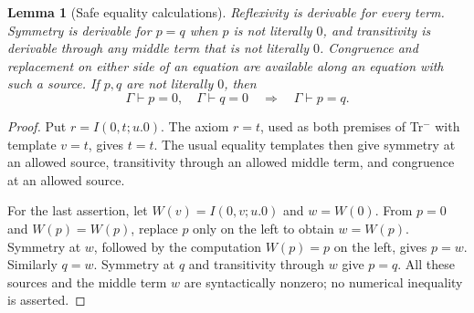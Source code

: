 \documentclass[11pt,letterpaper]{article}
\newtheorem{lemma}[theorem]{Lemma}
\theoremstyle{definition}
\begin{document}
\begin{lemma}[Safe equality calculations]\label{lem:safe-equality}
Reflexivity is derivable for every term.  Symmetry is derivable for $p=q$
when $p$ is not literally $0$, and transitivity is derivable through any
middle term that is not literally $0$.  Congruence and replacement on
either side of an equation are available along an equation with such a
source.  If $p,q$ are not literally $0$, then
\[
 \Gamma\vdash p=0,\quad\Gamma\vdash q=0
 \quad\Longrightarrow\quad\Gamma\vdash p=q.
 \tag{Zero join}\label{eq:zero-join}
\]
\end{lemma}
\begin{proof}
Put $r=I(0,t;u.0)$.  The axiom $r=t$, used as both premises of
Tr$^{-}$ with template $v=t$, gives $t=t$.  The usual equality
templates then give symmetry at an allowed source, transitivity through
an allowed middle term, and congruence at an allowed source.

For the last assertion, let $W(v)=I(0,v;u.0)$ and $w=W(0)$.  From
$p=0$ and $W(p)=W(p)$, replace $p$ only on the left to obtain
$w=W(p)$.  Symmetry at $w$, followed by the computation $W(p)=p$
on the left, gives $p=w$.  Similarly $q=w$.  Symmetry at $q$ and
transitivity through $w$ give $p=q$.  All these sources and the middle
term $w$ are syntactically nonzero; no numerical inequality is asserted.
\end{proof}
\end{document}
